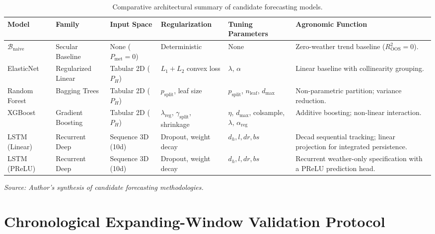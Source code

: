 \begin{table}[htbp]
\centering
\singlespacing
\footnotesize
\setlength{\tabcolsep}{3pt}
\renewcommand{\arraystretch}{1.12}
\caption{Comparative architectural summary of candidate forecasting models.}
\label{tab:model_summary}
\begin{tabularx}{\textwidth}{l p{2.2cm} p{2.0cm} p{2.4cm} p{2.4cm} X}
\toprule
\textbf{Model} & \textbf{Family} & \textbf{Input Space} & \textbf{Regularization} & \textbf{Tuning Parameters} & \textbf{Agronomic Function} \\
\midrule
$\mathcal{B}_{\text{naive}}$ & Secular Baseline & None ($P_{\text{met}}=0$) & Deterministic & None & Zero-weather trend baseline ($R^2_{\text{OOS}}=0$). \\
ElasticNet & Regularized Linear & Tabular 2D ($P_H$) & $L_1 + L_2$ convex loss & $\lambda$, $\alpha$ & Linear baseline with collinearity grouping. \\
Random Forest & Bagging Trees & Tabular 2D ($P_H$) & $p_{\text{split}}$, leaf size & $p_{\text{split}}$, $n_{\text{leaf}}$, $d_{\text{max}}$ & Non-parametric partition; variance reduction. \\
XGBoost & Gradient Boosting & Tabular 2D ($P_H$) & $\lambda_{\text{reg}}$, $\gamma_{\text{split}}$, shrinkage & $\eta$, $d_{\text{max}}$, colsample, $\lambda$, $\alpha_{\text{reg}}$ & Additive boosting; non-linear interaction. \\
LSTM (Linear) & Recurrent Deep & Sequence 3D (10d) & Dropout, weight decay & $d_h, l, dr, bs$ & Decad sequential tracking; linear projection for integrated persistence. \\
LSTM (PReLU) & Recurrent Deep & Sequence 3D (10d) & Dropout, weight decay & $d_h, l, dr, bs$ & Recurrent weather-only specification with a PReLU prediction head. \\
\bottomrule
\end{tabularx}
\vspace{0.2em}
{\footnotesize \textit{Source: Author's synthesis of candidate forecasting methodologies.}}
\end{table}


\section{Chronological Expanding-Window Validation Protocol}
\label{sec:meth_validation}

